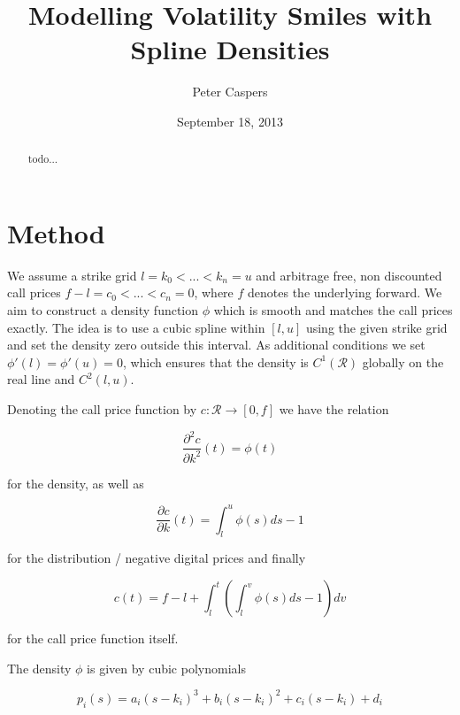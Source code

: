 \documentclass{amsart}
\theoremstyle{plain}
\numberwithin{equation}{section}
\begin{document}


\title{Modelling Volatility Smiles with Spline Densities}
\author{Peter Caspers}
\date{September 18, 2013}
\maketitle

\begin{abstract}
todo...
\end{abstract}

\section{Method}

We assume a strike grid $l=k_0 < ... < k_n=u$ and arbitrage free, non discounted call prices $f-l = c_0 < ... < c_n = 0$, where $f$ denotes the underlying forward. We aim to construct a density function $\phi$ which is smooth and matches the call prices exactly. The idea is to use a cubic spline within $[l,u]$ using the given strike grid and set the density zero outside this interval. As additional conditions we set $\phi'(l) = \phi'(u) = 0$, which ensures that the density is $C^1(\mathcal{R})$ globally on the real line and $C^2(l,u)$.

Denoting the call price function by $c:\mathcal{R}\rightarrow[0,f]$ we have the relation

\begin{equation}
\frac{\partial^2 c}{\partial k^2} (t) = \phi(t)
\end{equation}

for the density, as well as

\begin{equation}
\frac{\partial c}{\partial k} (t) = \int_{l}^{u} \phi(s) ds - 1
\end{equation}

for the distribution / negative digital prices and finally

\begin{equation}\label{integralC}
c(t) = f - l + \int_{l}^{t} \left( \int_{l}^{v} \phi(s) ds -1 \right) dv
\end{equation}

for the call price function itself.

The density $\phi$ is given by cubic polynomials

\begin{equation}
p_i(s) = a_i (s-k_i)^3 + b_i (s-k_i)^2 + c_i (s-k_i) + d_i
\end{equation}
\end{document}
